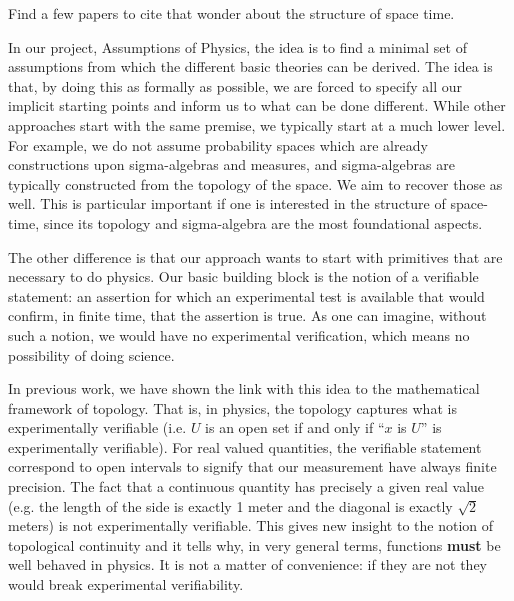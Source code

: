 \documentclass[12pt]{iopart}
\begin{document}
Find a few papers to cite that wonder about the structure of space time.

In our project, Assumptions of Physics, the idea is to find a minimal set of assumptions from which the different basic theories can be derived. The idea is that, by doing this as formally as possible, we are forced to specify all our implicit starting points and inform us to what can be done different. While other approaches start with the same premise, we typically start at a much lower level. For example, we do not assume probability spaces which are already constructions upon sigma-algebras and measures, and sigma-algebras are typically constructed from the topology of the space. We aim to recover those as well. This is particular important if one is interested in the structure of space-time, since its topology and sigma-algebra are the most foundational aspects.

The other difference is that our approach wants to start with primitives that are necessary to do physics. Our basic building block is the notion of a verifiable statement: an assertion for which an experimental test is available that would confirm, in finite time, that the assertion is true. As one can imagine, without such a notion, we would have no experimental verification, which means no possibility of doing science.

In previous work, we have shown the link with this idea to the mathematical framework of topology. That is, in physics, the topology captures what is experimentally verifiable (i.e. $U$ is an open set if and only if ``$x$ is $U$'' is experimentally verifiable). For real valued quantities, the verifiable statement correspond to open intervals to signify that our measurement have always finite precision. The fact that a continuous quantity has precisely a given real value (e.g. the length of the side is exactly 1 meter and the diagonal is exactly $\sqrt{2}$ meters) is not experimentally verifiable. This gives new insight to the notion of topological continuity and it tells why, in very general terms, functions \textbf{must} be well behaved in physics. It is not a matter of convenience: if they are not they would break experimental verifiability.
\end{document}
